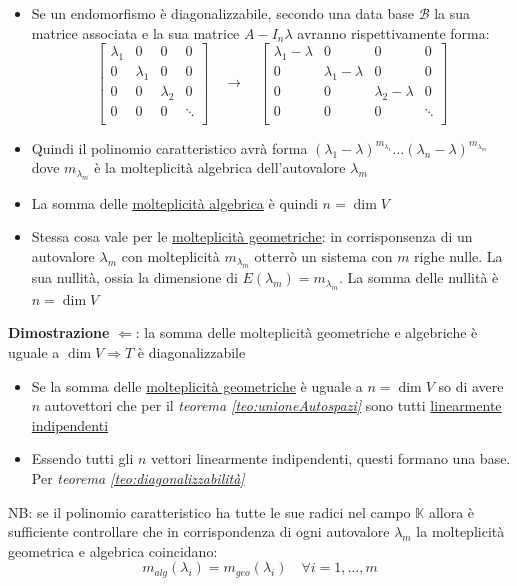\begin{itemize}
	\item  Se un endomorfismo è diagonalizzabile, secondo una data base $ \mathcal{B} $ la sua matrice associata e la sua matrice $ A - I_n \lambda  $ avranno rispettivamente forma:
	      \[
		      \begin{bmatrix}
			      \lambda_1 & 0         & 0         & 0      \\
			      0         & \lambda_1 & 0         & 0      \\
			      0         & 0         & \lambda_2 & 0      \\
			      0         & 0         & 0         & \ddots \\
		      \end{bmatrix}
		      \quad
		      \rightarrow
		      \quad
		      \begin{bmatrix}
			      \lambda_1-\lambda & 0                  & 0                   & 0      \\
			      0                 & \lambda_1 -\lambda & 0                   & 0      \\
			      0                 & 0                  & \lambda_2 - \lambda & 0      \\
			      0                 & 0                  & 0                   & \ddots \\
		      \end{bmatrix}
	      \]
	\item Quindi il polinomio caratteristico avrà forma $ \left( \lambda_1 - \lambda  \right)^{m_{\lambda_1}} \ldots \left( \lambda_n - \lambda  \right)^{m_{\lambda_m}}$ dove $ m_{\lambda_m} $ è la molteplicità algebrica dell'autovalore $ \lambda_m $
	\item La somma delle \underline{molteplicità algebrica} è quindi $ n = \dim  V $
	\item Stessa cosa vale per le \underline{molteplicità geometriche}: in corrisponsenza di un autovalore $ \lambda_m $ con molteplicità $ m_{\lambda_m} $ otterrò un sistema con $ m $ righe nulle. La sua nullità, ossia la dimensione di $ E\left( \lambda_m \right)=m_{\lambda_m}  $. La somma delle nullità è $ n = \dim  V $
\end{itemize}
\textbf{Dimostrazione} $ \Leftarrow $: la somma delle molteplicità geometriche e algebriche è uguale a $ \dim V  \Rightarrow  T $ è diagonalizzabile
\begin{itemize}
	\item Se la somma delle \underline{molteplicità geometriche} è uguale a $ n = \dim V $ so di avere $ n $ autovettori che per il \textit{teorema  \ref{teo:unioneAutospazi}} sono tutti \underline{linearmente indipendenti}
	\item Essendo tutti gli $ n $ vettori linearmente indipendenti, questi formano una base. Per \textit{teorema  \ref{teo:diagonalizzabilità}}
\end{itemize}
NB: se il polinomio caratteristico ha tutte le sue radici nel campo $ \mathbb{K} $ allora è sufficiente controllare che in corrispondenza di ogni autovalore $ \lambda_m $ la molteplicità geometrica e algebrica coincidano:
\[
	m_{alg}\left( \lambda_i \right) = m_{geo}\left( \lambda_i \right) \quad \forall i = 1, \ldots, m
\]

